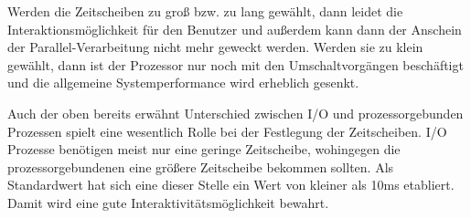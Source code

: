 Werden die Zeitscheiben zu groß bzw. zu lang gewählt, dann leidet die Interaktionsmöglichkeit für den Benutzer und außerdem kann dann der Anschein der Parallel\--Ver\-arbeitung nicht mehr geweckt werden.
Werden sie zu klein gewählt, dann ist der Prozessor nur noch mit den Umschaltvorgängen beschäftigt und die allgemeine Systemperformance wird erheblich gesenkt.

Auch der oben bereits erwähnt Unterschied zwischen I/O und prozessorgebunden Prozessen spielt eine wesentlich Rolle bei der Festlegung der Zeitscheiben. I/O Prozesse benötigen meist nur eine geringe Zeitscheibe, wohingegen die prozessorgebundenen eine größere Zeitscheibe bekommen sollten. Als Standardwert hat sich eine dieser Stelle ein Wert von kleiner als 10ms etabliert. Damit wird eine gute Interaktivitätsmöglichkeit bewahrt.
%
